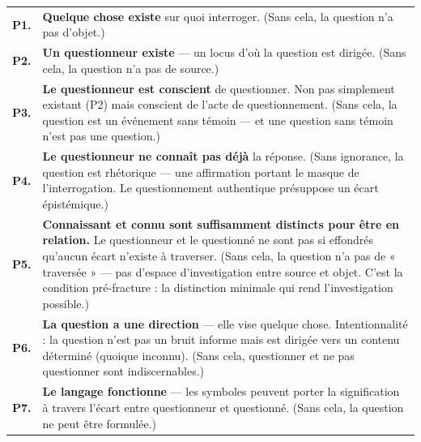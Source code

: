 \documentclass[10pt, openany, oneside]{book}
\renewcommand{\footnotesize}{\fontsize{8.5}{11}\selectfont}
\begin{document}
\vspace{0.5em}

{\footnotesize
\noindent\begin{tabular}{r p{}}
\textbf{P1.} & \textbf{Quelque chose existe} sur quoi interroger. (Sans cela, la question n'a pas d'objet.) \\[0.3em]
\textbf{P2.} & \textbf{Un questionneur existe} --- un locus d'où la question est dirigée. (Sans cela, la question n'a pas de source.) \\[0.3em]
\textbf{P3.} & \textbf{Le questionneur est conscient} de questionner. Non pas simplement existant (P2) mais conscient de l'acte de questionnement. (Sans cela, la question est un événement sans témoin --- et une question sans témoin n'est pas une question.) \\[0.3em]
\textbf{P4.} & \textbf{Le questionneur ne connaît pas déjà} la réponse. (Sans ignorance, la question est rhétorique --- une affirmation portant le masque de l'interrogation. Le questionnement authentique présuppose un écart épistémique.) \\[0.3em]
\textbf{P5.} & \textbf{Connaissant et connu sont suffisamment distincts pour être en relation.} Le questionneur et le questionné ne sont pas si effondrés qu'aucun écart n'existe à traverser. (Sans cela, la question n'a pas de « traversée » --- pas d'espace d'investigation entre source et objet. C'est la condition pré-fracture : la distinction minimale qui rend l'investigation possible.) \\[0.3em]
\textbf{P6.} & \textbf{La question a une direction} --- elle vise quelque chose. Intentionnalité : la question n'est pas un bruit informe mais est dirigée vers un contenu déterminé (quoique inconnu). (Sans cela, questionner et ne pas questionner sont indiscernables.) \\[0.3em]
\textbf{P7.} & \textbf{Le langage fonctionne} --- les symboles peuvent porter la signification à travers l'écart entre questionneur et questionné. (Sans cela, la question ne peut être formulée.) \\[0.3em]
\end{tabular}
}
\end{document}

